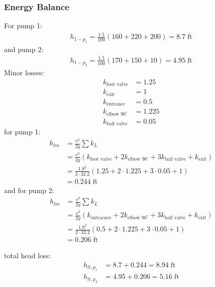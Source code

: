 \subsubsection{Energy Balance}
For pump 1:
\begin{align*}
    h_{1-p_1} = \frac{1.5}{100} \left(160 + 220 + 200\right) = 8.7 \; \text{ft}
\end{align*}
and pump 2:
\begin{align*}
    h_{1-p_2} = \frac{1.5}{100} \left(170 + 150 + 10\right) = 4.95 \; \text{ft}
\end{align*}
Minor losses:
\begin{align*}
    k_{\text{foot valve}}     & = 1.25  \\
    k_\text{exit}             & = 1     \\
    k_\text{entrance}         & = 0.5   \\
    k_{\text{elbow 90}^\circ} & = 1.225 \\
    k_{\text{ball valve}}     & = 0.05
\end{align*}
for pump 1:
\begin{align*}
    h_{lm} & = \frac{v^2}{2g} \sum k_L                                                                                                    \\
           & =  \frac{v^2}{2g} \left(k_{\text{foot valve}} + 2 k_{\text{elbow 90}^\circ} + 3 k_{\text{ball valve}} + k_\text{exit}\right) \\
           & = \frac{1.8^2}{2 \cdot 32.2} \left(1.25 + 2 \cdot 1.225 + 3 \cdot 0.05 + 1\right)                                            \\
           & = 0.244 \; \text{ft}
\end{align*}
and for pump 2:
\begin{align*}
    h_{lm} & = \frac{v^2}{2g} \sum k_L                                                                                                   \\
           & =  \frac{v^2}{2g} \left(k_{\text{entracnce}} + 2 k_{\text{elbow 90}^\circ} + 3 k_{\text{ball valve}} + k_\text{exit}\right) \\
           & = \frac{1.8^2}{2 \cdot 32.2} \left(0.5 + 2 \cdot 1.225 + 3 \cdot 0.05 + 1\right)                                            \\
           & = 0.206 \; \text{ft}
\end{align*}

total head loss:
\begin{align*}
    h_{lt, p_1} & = 8.7 + 0.244 = 8.94 \; \text{ft}  \\
    h_{lt, p_2} & = 4.95 + 0.206 = 5.16 \; \text{ft}
\end{align*}

